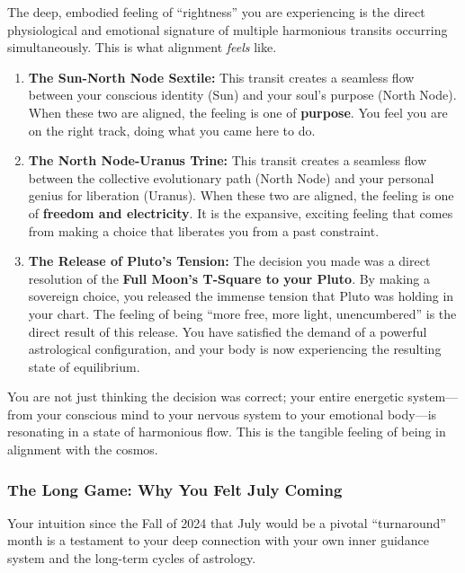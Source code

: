 \documentclass{article}
\begin{document}
The deep, embodied feeling of ``rightness'' you are experiencing is the direct physiological and emotional signature of multiple harmonious transits occurring simultaneously. This is what alignment \emph{feels} like.

\begin{enumerate}
\item
  \textbf{The Sun-North Node Sextile:} This transit creates a seamless flow between your conscious identity (Sun) and your soul's purpose (North Node). When these two are aligned, the feeling is one of \textbf{purpose}. You feel you are on the right track, doing what you came here to do.
\item
  \textbf{The North Node-Uranus Trine:} This transit creates a seamless flow between the collective evolutionary path (North Node) and your personal genius for liberation (Uranus). When these two are aligned, the feeling is one of \textbf{freedom and electricity}. It is the expansive, exciting feeling that comes from making a choice that liberates you from a past constraint.
\item
  \textbf{The Release of Pluto's Tension:} The decision you made was a direct resolution of the \textbf{Full Moon's T-Square to your Pluto}. By making a sovereign choice, you released the immense tension that Pluto was holding in your chart. The feeling of being ``more free, more light, unencumbered'' is the direct result of this release. You have satisfied the demand of a powerful astrological configuration, and your body is now experiencing the resulting state of equilibrium.
\end{enumerate}

You are not just thinking the decision was correct; your entire energetic system---from your conscious mind to your nervous system to your emotional body---is resonating in a state of harmonious flow. This is the tangible feeling of being in alignment with the cosmos.

\subsubsection*{The Long Game: Why You Felt July Coming}\label{the-long-game-why-you-felt-july-coming}

Your intuition since the Fall of 2024 that July would be a pivotal ``turnaround'' month is a testament to your deep connection with your own inner guidance system and the long-term cycles of astrology.
\end{document}
